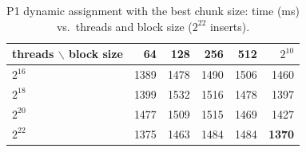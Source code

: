 \begin{table}[H]\centering\small
\caption{P1 dynamic assignment with the best chunk size: time (ms) vs.\ threads and block size ($2^{22}$ inserts).}\label{tab:p1dyn}
\begin{tabular}{lrrrrr}
\toprule
threads $\backslash$ block size & 64 & 128 & 256 & 512 & $2^{10}$ \\
\midrule
$2^{16}$ & 1389 & 1478 & 1490 & 1506 & 1460 \\
$2^{18}$ & 1399 & 1532 & 1516 & 1478 & 1397 \\
$2^{20}$ & 1477 & 1509 & 1515 & 1469 & 1427 \\
$2^{22}$ & 1375 & 1463 & 1484 & 1484 & \textbf{1370} \\
\bottomrule
\end{tabular}
\end{table}
